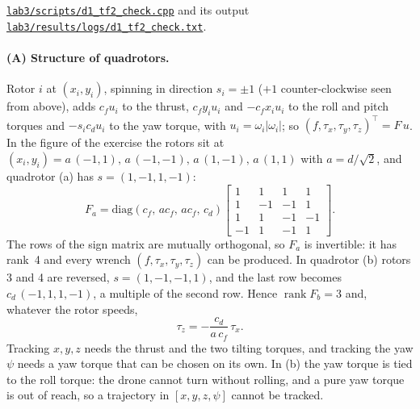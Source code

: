 \documentclass[a4paper]{tufte-handout}
\newcommand{\repo}[1]{\href{https://github.com/Qzz139/LEARN-MIT16.485/blob/main/#1}{\nolinkurl{#1}}}
\begin{document}
\begin{evidence}
\repo{lab3/scripts/d1_tf2_check.cpp} and its output
\repo{lab3/results/logs/d1_tf2_check.txt}.
\end{evidence}


\paragraph{(A) Structure of quadrotors.}
Rotor $i$ at $(x_i,y_i)$, spinning in direction $s_i=\pm1$ ($+1$ counter-clockwise
seen from above), adds $c_f u_i$ to the thrust, $c_f y_i u_i$ and $-c_f x_i u_i$ to
the roll and pitch torques and $-s_i c_d u_i$ to the yaw torque, with
$u_i=\omega_i|\omega_i|$; so $(f,\tau_x,\tau_y,\tau_z)^\top=F\,u$.
In the figure of the exercise the rotors sit at
$(x_i,y_i)=a\,(-1,1),\,a\,(-1,-1),\,a\,(1,-1),\,a\,(1,1)$ with $a=d/\sqrt2$, and
quadrotor (a) has $s=(1,-1,1,-1)$:
\begin{equation*}
F_a=\mathrm{diag}(c_f,\,a c_f,\,a c_f,\,c_d)
\begin{bmatrix} 1&1&1&1\\ 1&-1&-1&1\\ 1&1&-1&-1\\ -1&1&-1&1 \end{bmatrix}.
\end{equation*}
The rows of the sign matrix are mutually orthogonal, so $F_a$ is invertible:
it has rank~4 and every wrench $(f,\tau_x,\tau_y,\tau_z)$ can be produced.
In quadrotor (b) rotors 3 and 4 are reversed, $s=(1,-1,-1,1)$, and the last row
becomes $c_d\,(-1,1,1,-1)$, a multiple of the second row. Hence
$\operatorname{rank}F_b=3$ and, whatever the rotor speeds,
\begin{equation*}
\tau_z = -\frac{c_d}{a\,c_f}\,\tau_x .
\end{equation*}
Tracking $x,y,z$ needs the thrust and the two tilting torques, and tracking the
yaw $\psi$ needs a yaw torque that can be chosen on its own. In (b) the yaw torque
is tied to the roll torque: the drone cannot turn without rolling, and a pure yaw
torque is out of reach, so a trajectory in $[x,y,z,\psi]$ cannot be tracked.
\end{document}
